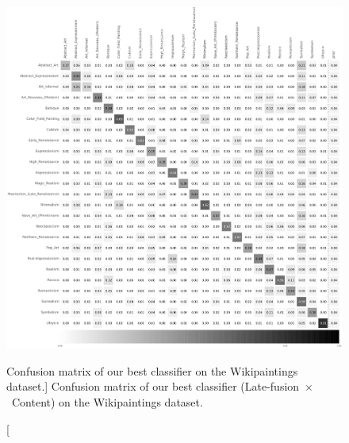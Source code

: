 \begin{figure}[ht!]
\centering
\includegraphics[width=1\linewidth]{../style/figures/evaluation/wikipaintings_conf.pdf}
\caption
[Confusion matrix of our best classifier on the Wikipaintings dataset.]
{Confusion matrix of our best classifier (\mbox{Late-fusion $\times$ Content}) on the Wikipaintings dataset.}
\label{fig:wp_conf}
\end{figure}


